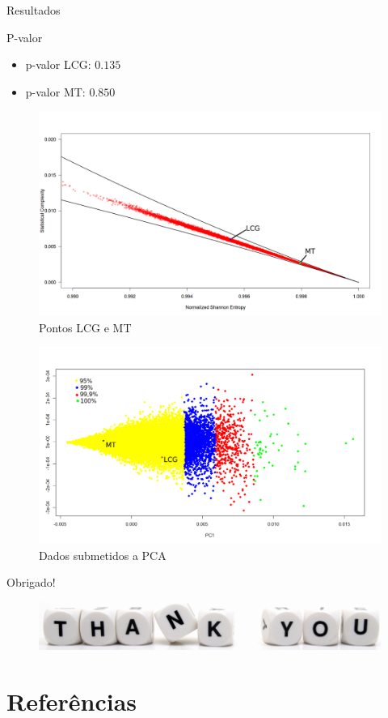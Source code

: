 \documentclass[xcolor=dvipsnames]{beamer}
\begin{document}
\begin{frame}{Resultados}
    \begin{block}{P-valor}
    \begin{itemize}
      \item p-valor LCG: $0.135$
      \pause
      \item p-valor MT: $0.850$
      \pause
      \end{itemize}
  \end{block}
    \begin{figure}
      \includegraphics[scale=0.25,center]{../Planck_no_PCA_labels}
      \caption{Pontos LCG e MT}
      \end{figure}
\end{frame}

\begin{frame}{}
    \begin{figure}
      \includegraphics[scale=0.25,center]{../Planck_MT_LCG_labels}
      \caption{Dados submetidos a PCA}
      \end{figure}
\end{frame}


\begin{frame}{Obrigado!}
    \begin{figure}
      \includegraphics[scale=0.5,center]{thankyou}
      \end{figure}
\end{frame}

\section*{Referências}


\end{document}
